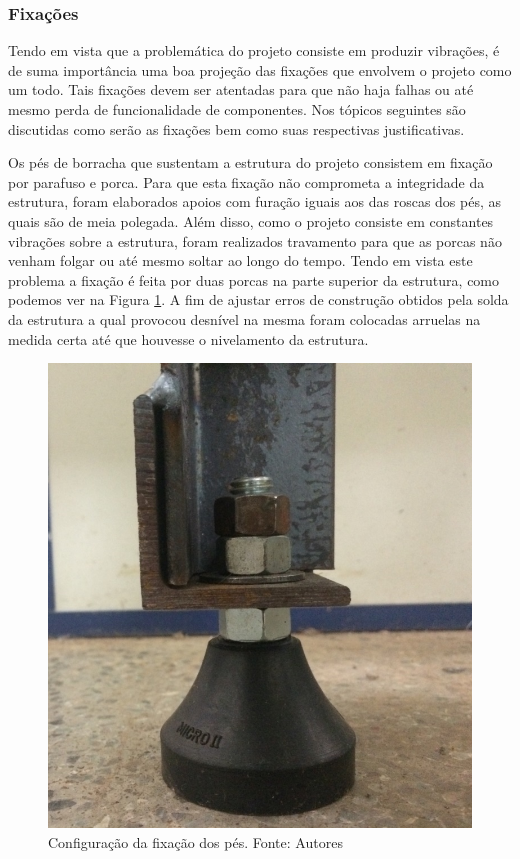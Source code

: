 \subsubsection*{\textbf{Fixações}}

    Tendo em vista que a problemática do projeto consiste em produzir vibrações, é de suma importância uma boa projeção das fixações que envolvem o projeto como um todo. Tais fixações devem ser atentadas para que não haja falhas ou até mesmo perda de funcionalidade de componentes. Nos tópicos seguintes são discutidas como serão as fixações bem como suas respectivas justificativas.


    Os pés de borracha que sustentam a estrutura do projeto consistem em fixação por parafuso e porca. Para que esta fixação não comprometa a integridade da estrutura, foram elaborados apoios com furação iguais aos das roscas dos pés, as quais são de meia polegada. Além disso, como o projeto consiste em constantes vibrações sobre a estrutura, foram realizados travamento para que as porcas não venham folgar ou até mesmo soltar ao longo do tempo. 
    Tendo em vista este problema a fixação é feita por duas porcas na parte superior da estrutura, como podemos ver na Figura \ref{fig:config_pes}. A fim de ajustar erros de construção obtidos pela solda da estrutura a qual provocou desnível na mesma foram colocadas arruelas na medida certa até que houvesse o nivelamento da estrutura.

    \begin{figure}[H]
      \centering
      \includegraphics[scale=0.4]{figuras/config_pes_jpg.png}
      \caption{Configuração da fixação dos pés. Fonte: Autores}
      \label{fig:config_pes}
      \end{figure}


